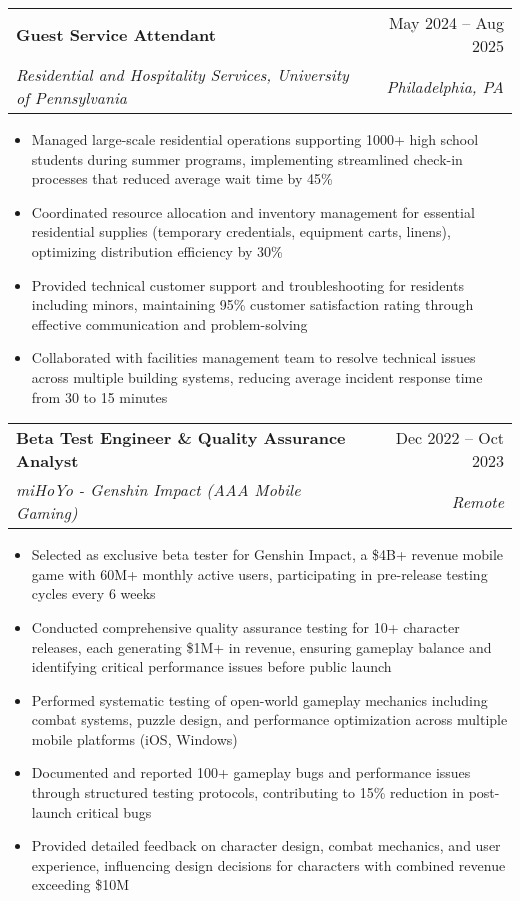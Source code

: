 \documentclass[letterpaper,11pt]{article}
\makeatletter
\newcommand{\resumeItem}[1]{
  \item\small{
    {#1 \vspace{-3pt}}
  }
}
\newcommand{\resumeSubheading}[4]{
  \vspace{-2pt}\item
    \begin{tabular*}{0.97\textwidth}[t]{l@{\extracolsep{\fill}}r}
      \textbf{#1} & #2 \\
      \textit{\small#3} & \textit{\small #4} \\
    \end{tabular*}\vspace{-7pt}
}
\newcommand{\resumeSubSubheading}[2]{
    \vspace{-7pt}\item
    \begin{tabular*}{0.97\textwidth}{l@{\extracolsep{\fill}}r}
      \textit{\small#1} & \textit{\small #2} \\
    \end{tabular*}\vspace{-7pt}
}
\newcommand{\resumeSubHeadingListEnd}{\end{itemize}}
\newcommand{\resumeItemListStart}{\begin{itemize}}
\newcommand{\resumeItemListEnd}{\end{itemize}\vspace{-5pt}}
\makeatother
\begin{document}
    \resumeSubheading
      {Guest Service Attendant}{May 2024 -- Aug 2025}
      {Residential and Hospitality Services, University of Pennsylvania}{Philadelphia, PA}
      \resumeItemListStart
        \resumeItem{Managed large-scale residential operations supporting 1000+ high school students during summer programs, implementing streamlined check-in processes that reduced average wait time by 45\%}
        \resumeItem{Coordinated resource allocation and inventory management for essential residential supplies (temporary credentials, equipment carts, linens), optimizing distribution efficiency by 30\%}
        \resumeItem{Provided technical customer support and troubleshooting for residents including minors, maintaining 95\% customer satisfaction rating through effective communication and problem-solving}
        \resumeItem{Collaborated with facilities management team to resolve technical issues across multiple building systems, reducing average incident response time from 30 to 15 minutes}
    \resumeItemListEnd

    \resumeSubheading
      {Beta Test Engineer \& Quality Assurance Analyst}{Dec 2022 -- Oct 2023}
      {miHoYo - Genshin Impact (AAA Mobile Gaming)}{Remote}
      \resumeItemListStart
        \resumeItem{Selected as exclusive beta tester for Genshin Impact, a \$4B+ revenue mobile game with 60M+ monthly active users, participating in pre-release testing cycles every 6 weeks}
        \resumeItem{Conducted comprehensive quality assurance testing for 10+ character releases, each generating \$1M+ in revenue, ensuring gameplay balance and identifying critical performance issues before public launch}
        \resumeItem{Performed systematic testing of open-world gameplay mechanics including combat systems, puzzle design, and performance optimization across multiple mobile platforms (iOS, Windows)}
        \resumeItem{Documented and reported 100+ gameplay bugs and performance issues through structured testing protocols, contributing to 15\% reduction in post-launch critical bugs}
        \resumeItem{Provided detailed feedback on character design, combat mechanics, and user experience, influencing design decisions for characters with combined revenue exceeding \$10M}
    \resumeItemListEnd
      
\end{document}
